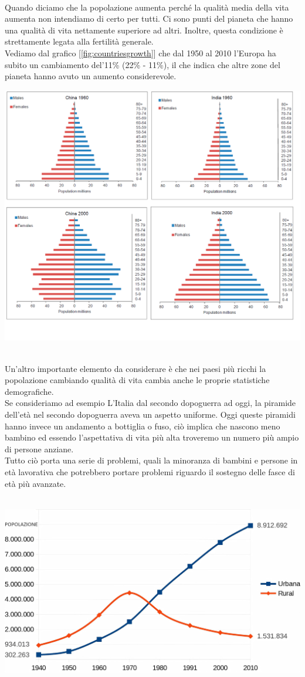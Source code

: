 \documentclass[a4paper,12pt, oneside]{book}
\begin{document}
	\leavevmode\\
	Quando diciamo che la popolazione aumenta perché la qualità media della vita aumenta non intendiamo di certo per tutti. Ci sono punti del pianeta che hanno una qualità di vita nettamente superiore ad altri. Inoltre, questa condizione è strettamente legata alla fertilità generale.\\
	Vediamo dal grafico [\ref{fig:countriesgrowth}] che dal 1950 al 2010 l'Europa ha subito un cambiamento del'11\%   (22\% - 11\%), il che indica che altre zone del pianeta hanno avuto un aumento considerevole.
	\leavevmode\\
	\begin{center}
		\includegraphics[width=0.7\linewidth]{"Immagini/pyramid-demographic"}
	\end{center}
	\leavevmode\\
	Un'altro importante elemento da considerare è che nei paesi più ricchi la popolazione cambiando qualità di vita cambia anche le proprie statistiche demografiche.\\
	Se consideriamo ad esempio L'Italia dal secondo dopoguerra ad oggi, la piramide dell'età nel secondo dopoguerra aveva un aspetto uniforme. Oggi queste piramidi hanno invece un andamento a bottiglia o fuso, ciò implica che nascono meno bambino ed essendo l'aspettativa di vita più alta troveremo un numero più ampio di persone anziane.\\
	Tutto ciò porta una serie di problemi, quali la minoranza di bambini e persone in età lavorativa che potrebbero portare problemi riguardo il sostegno delle fasce di età più avanzate.\\
	\leavevmode\\
	 \begin{center}
		\includegraphics[width=0.7\linewidth]{"Immagini/popolazione urbana-rurale"}
	 \end{center}
\end{document}
